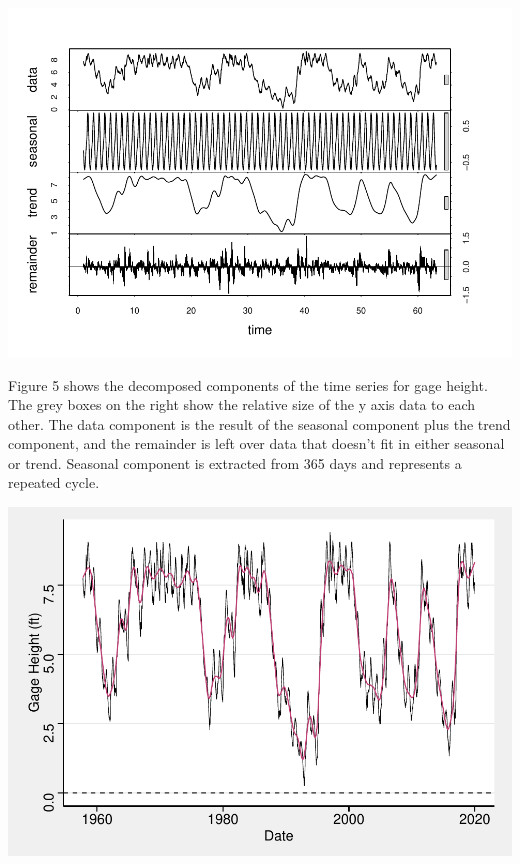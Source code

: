 \documentclass[12pt,]{article}
\let\origfigure\figure
\let\endorigfigure\endfigure
\renewenvironment{figure}[1][2] {
    \expandafter\origfigure\expandafter[H]
} {
    \endorigfigure
}
\begin{document}
\begin{figure}
\centering
\includegraphics{Shintaku_ENV872_Project_files/figure-latex/unnamed-chunk-7-1.pdf}
\caption{Lake Tahoe Gage Height Time Series Decomposed}
\end{figure}

Figure 5 shows the decomposed components of the time series for gage
height. The grey boxes on the right show the relative size of the y axis
data to each other. The data component is the result of the seasonal
component plus the trend component, and the remainder is left over data
that doesn't fit in either seasonal or trend. Seasonal component is
extracted from 365 days and represents a repeated cycle.

\begin{figure}
\centering
\includegraphics{Shintaku_ENV872_Project_files/figure-latex/unnamed-chunk-8-1.pdf}
\caption{Trend Component Against Actual Data}
\end{figure}
\end{document}

